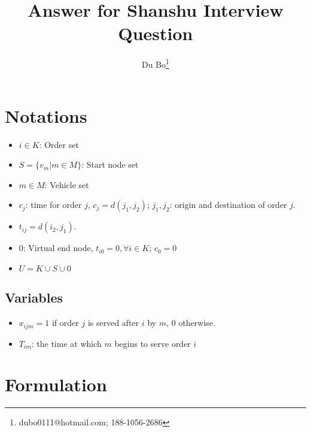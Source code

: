 \documentclass[a4paper]{article}
\title{Answer for Shanshu Interview Question}
\author{Du Bo\thanks{dubo0111@hotmail.com; 188-1056-2686}}
\begin{document}
\maketitle

\section{Notations}

\begin{itemize}
 \item $i\in K$: Order set
 \item $S=\{v_m|m\in M\}$: Start node set
 \item $m\in M$: Vehicle set
 \item $c_j$: time for order $j$, $c_j = d(j_1,j_2)$; $j_1,j_2$: origin and destination of order $j$.
 \item $t_{ij} = d(i_2,j_1)$.
 \item 0: Virtual end node, $t_{i0} = 0, \forall i\in K$; $c_0 =0$
 \item $U = K \cup S  \cup 0$
\end{itemize}

\subsection{Variables}

\begin{itemize}
 \item $x_{ijm}=1$ if order $j$ is served after $i$ by $m$, $0$ otherwise.
 \item $T_{im}$: the time at which $m$ begins to serve order $i$
\end{itemize}

\section{Formulation}
\end{document}
